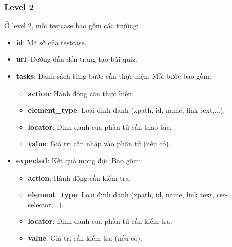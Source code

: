 \subsubsection{Level 2}
Ở level 2, mỗi testcase bao gồm các trường:
\begin{itemize}
    \item \textbf{id}: Mã số của testcase.
    \item \textbf{url}: Đường dẫn đến trang tạo bài quiz.
    \item \textbf{tasks}: Danh sách từng bước cần thực hiện. Mỗi bước bao gồm:
\begin{itemize}
    \item \textbf{action}: Hành động cần thực hiện.
    \item \textbf{element\_type}: Loại định danh (xpath, id, name, link text,...).
    \item \textbf{locator}: Định danh của phần tử cần thao tác.
    \item \textbf{value}: Giá trị cần nhập vào phần tử (nếu có).
\end{itemize}
    \item \textbf{expected}: Kết quả mong đợi. Bao gồm:
\begin{itemize}
    \item \textbf{action}: Hành động cần kiểm tra.
    \item \textbf{element\_type}: Loại định danh (xpath, id, name, link text, css-selector,...).
    \item \textbf{locator}: Định danh của phần tử cần kiểm tra.
    \item \textbf{value}: Giá trị cần kiểm tra (nếu có).
\end{itemize}
\end{itemize}

